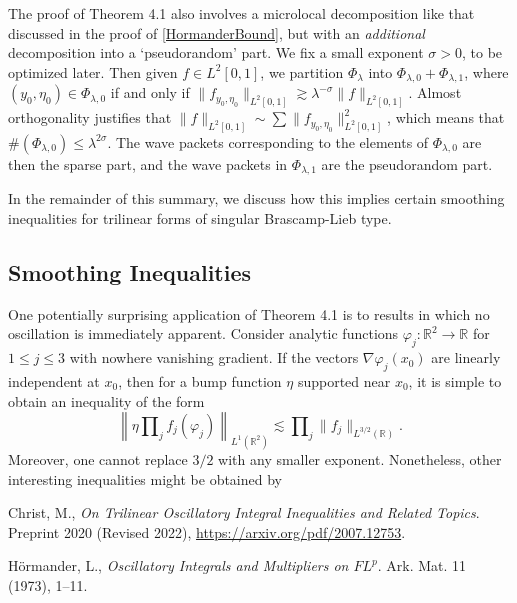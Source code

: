 \documentclass[12pt]{amsart}
\newcommand*{\R}{\mathbb{R}}
\begin{document}
The proof of Theorem 4.1 also involves a microlocal decomposition like that discussed in the proof of \eqref{HormanderBound}, but with an \emph{additional} decomposition into a `pseudorandom' part. We fix a small exponent $\sigma > 0$, to be optimized later. Then given $f \in L^2[0,1]$, we partition $\Phi_\lambda$ into $\Phi_{\lambda,0} + \Phi_{\lambda,1}$, where $(y_0,\eta_0) \in \Phi_{\lambda,0}$ if and only if $\| f_{y_0,\eta_0} \|_{L^2[0,1]} \gtrsim \lambda^{-\sigma} \| f \|_{L^2[0,1]}$. Almost orthogonality justifies that $\| f \|_{L^2[0,1]} \sim \sum \| f_{y_0,\eta_0} \|_{L^2[0,1]}^2$, which means that $\#(\Phi_{\lambda,0}) \leq \lambda^{2\sigma}$. The wave packets corresponding to the elements of $\Phi_{\lambda,0}$ are then the sparse part, and the wave packets in $\Phi_{\lambda,1}$ are the pseudorandom part.

In the remainder of this summary, we discuss how this implies certain smoothing inequalities for trilinear forms of singular Brascamp-Lieb type.

\subsection{Smoothing Inequalities}

One potentially surprising application of Theorem 4.1 is to results in which no oscillation is immediately apparent. Consider analytic functions $\varphi_j: \R^2 \to \R$ for $1 \leq j \leq 3$ with nowhere vanishing gradient. If the vectors $\nabla \varphi_j(x_0)$ are linearly independent at $x_0$, then for a bump function $\eta$ supported near $x_0$, it is simple to obtain an inequality of the form
%
\[ \left\| \eta \prod\nolimits_j f_j(\varphi_j) \right\|_{L^1(\R^2)} \lesssim \prod\nolimits_j \| f_j \|_{L^{3/2}(\R)}. \]
%
Moreover, one cannot replace $3/2$ with any smaller exponent. Nonetheless, other interesting inequalities might be obtained by 


\begin{thebibliography}{03}

Christ, M., \emph{On Trilinear Oscillatory Integral Inequalities and Related Topics}.
Preprint 2020 (Revised 2022), \href{https://arxiv.org/pdf/2007.12753}{https://arxiv.org/pdf/2007.12753}.

H\"{o}rmander, L., \emph{Oscillatory Integrals and Multipliers on $FL^p$}. Ark. Mat. 11 (1973), 1--11.





\end{thebibliography}
\end{document}
